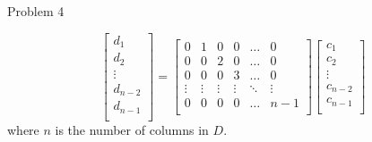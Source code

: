 \begin{problem}{Problem 4}
\begin{highlight}[Solution]
        \begin{equation}
            \begin{bmatrix}
                d_{1} \\
                d_{2} \\
                \vdots \\
                d_{n - 2} \\
                d_{n - 1} \\
            \end{bmatrix}
            = 
            \begin{bmatrix}
                0 & 1 & 0 & 0 & \dots & 0 \\
                0 & 0 & 2 & 0 & \dots & 0 \\
                0 & 0 & 0 & 3 & \dots & 0 \\
                \vdots & \vdots & \vdots & \vdots & \ddots & \vdots \\
                0 & 0 & 0 & 0 & \dots & n - 1 \\
            \end{bmatrix}
            \begin{bmatrix}
                c_{1} \\
                c_{2} \\
                \vdots \\
                c_{n - 2} \\
                c_{n - 1} \\
            \end{bmatrix}
        \end{equation}
        where $n$ is the number of columns in $D$.
    \end{highlight}
\end{problem}

